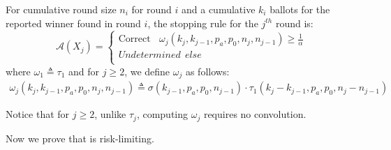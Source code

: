 
\begin{definition}
    \label{def:minervatwo}
    For cumulative round size $n_i$ for round $i$ and a cumulative $k_i$ ballots for the reported winner found in round $i$, the \R \Providence stopping rule for the $j^{th}$ round is:
$$
\mathcal{A}(X_{j})=  \left\{ \begin{array}{ll} \text{Correct} ~~~~ \omega_{j}(k_{j}, k_{j-1}, p_a, p_0, n_j, n_{j-1}) \geq \frac{1}{\alpha}\\
        Undetermined ~~else \\
    \end{array}
    \right .
$$
where $\omega _{1}\triangleq \tau_{1}$ and for $j\ge 2$, we define $\omega _{j}$ as follows:
\begin{equation}
    \begin{aligned}
    \omega_{j}(k_{j}, k_{j-1}, p_a, p_0, n_{j}, n_{j-1})\triangleq
    \sigma(k_{j-1},p_a,p_0,n_{j-1})\cdot \tau_1(k_{j}-k_{j-1},p_a,p_0,n_j-n_{j-1})
    \end{aligned}
\end{equation}
\end{definition}

Notice that for $j\ge 2$, unlike $\tau_j$, computing $\omega_j$ requires no convolution.

Now we prove that \Providence is risk-limiting.

